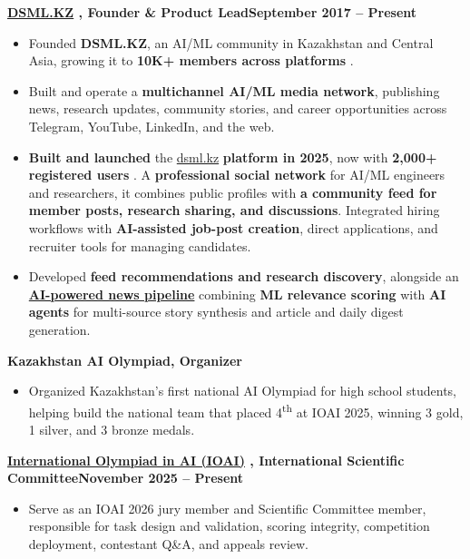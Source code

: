 \documentclass[11pt,a4paper]{article}
\newcommand{\TitleFont}{\fontsize{12.8}{15.8}\selectfont}
\newcommand{\DateFont}{\fontsize{12.1}{15.0}\selectfont}
\newcommand{\muted}[1]{\textcolor{secondary}{#1}}
\newcommand{\plainlink}[2]{%
  \href{#2}{\textcolor{textgray}{#1}}%
}
\newcommand{\metric}[1]{%
  \textcolor{accent}{\textbf{#1}}%
}
\newcommand{\jobgap}{\vspace{0.55em}}
\begin{document}
{\TitleFont\bfseries \plainlink{DSML.KZ}{https://dsml.kz}\textnormal{, Founder \& Product Lead}\hfill{\DateFont\textnormal{\muted{September 2017 -- Present}}}\par}
\begin{itemize}
\item Founded \textbf{DSML.KZ}, an AI/ML community in Kazakhstan and Central Asia, growing it to \metric{10K+ members across platforms}.
\item Built and operate a \textbf{multichannel AI/ML media network}, publishing news, research updates, community stories, and career opportunities across Telegram, YouTube, LinkedIn, and the web.
\item \textbf{Built and launched} the \plainlink{dsml.kz}{https://dsml.kz} \textbf{platform in 2025}, now with \metric{2,000+ registered users}. A \textbf{professional social network} for AI/ML engineers and researchers, it combines public profiles with \textbf{a community feed for member posts, research sharing, and discussions}. Integrated hiring workflows with \textbf{AI-assisted job-post creation}, direct applications, and recruiter tools for managing candidates.
\item Developed \textbf{feed recommendations and research discovery}, alongside an \textbf{\plainlink{AI-powered news pipeline}{https://dsml.kz/ai-radar}} combining \textbf{ML relevance scoring} with \textbf{AI agents} for multi-source story synthesis and article and daily digest generation.
\end{itemize}

\jobgap

{\TitleFont\bfseries Kazakhstan AI Olympiad\textnormal{, Organizer}\par}
\begin{itemize}
\item Organized Kazakhstan's first national AI Olympiad for high school students, helping build the national team that placed 4\textsuperscript{th} at IOAI 2025, winning 3 gold, 1 silver, and 3 bronze medals.
\end{itemize}

\jobgap

{\TitleFont\bfseries \plainlink{International Olympiad in AI (IOAI)}{https://ioai-official.org/about/scientific-committee/}\textnormal{, International Scientific Committee}\hfill{\DateFont\textnormal{\muted{November 2025 -- Present}}}\par}
\begin{itemize}
    \item Serve as an IOAI 2026 jury member and Scientific Committee member, responsible for task design and validation, scoring integrity, competition deployment, contestant Q\&A, and appeals review.
\end{itemize}
\end{document}
